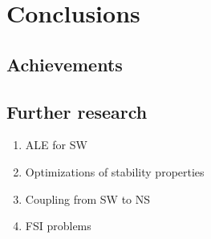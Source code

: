 
\chapter{Conclusions}
\label{conclusions}




\section{Achievements}





\section{Further research}


\begin{enumerate}
    \item ALE for SW
    \item Optimizations of stability properties
    \item Coupling from SW to NS
    \item FSI problems
\end{enumerate}

